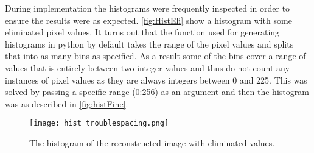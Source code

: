 During implementation the histograms were frequently inspected in order to ensure the results were as expected. \autoref{fig:HistEli} show a histogram with some eliminated pixel values. It turns out that the function used for generating histograms in python by default takes the range of the pixel values and splits that into as many bins as specified. As a result some of the bins cover a range of values that is entirely between two integer values and thus do not count any instances of pixel values as they are always integers between 0 and 225. This was solved by passing a specific range (0:256) as an argument and then the histogram was as described in \autoref{fig:histFine}.   
\begin{figure}[h]
\centering
\texttt{[image: hist\_troublespacing.png]}
\caption{The histogram of the reconstructed image with eliminated values.}
\label{fig:HistEli}
\end{figure} 

